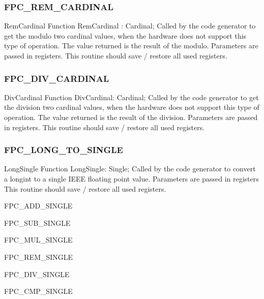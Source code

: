 \documentclass [a4paper,12pt]{article}
\begin{document}
\subsubsection{FPC{\_}REM{\_}CARDINAL}
\label{subsubsec:mylabel107}

\begin{function}{RemCardinal}
\Declaration
Function RemCardinal : Cardinal;
\Description
Called by the code generator to get the modulo two cardinal values, when the
hardware does not support this type of operation. The value returned is the
result of the modulo.
\Parameters
Parameters are passed in registers.
\Notes
This routine should save / restore all used registers.
\end{function}

\subsubsection{FPC{\_}DIV{\_}CARDINAL}
\label{subsubsec:mylabel108}

\begin{function}{DivCardinal}
\Declaration
Function DivCardinal: Cardinal;
\Description
Called by the code generator to get the division two cardinal values, when
the hardware does not support this type of operation. The value returned is
the result of the division.
\Parameters
Parameters are passed in registers.
\Notes
This routine should save / restore all used registers.
\end{function}

\subsubsection{FPC{\_}LONG{\_}TO{\_}SINGLE}
\label{subsubsec:mylabel109}

\begin{function}{LongSingle}
\Declaration
Function LongSingle: Single;
\Description
Called by the code generator to convert a longint to a single IEEE floating
point value.
\Parameters
Parameters are passed in registers
\Notes
This routine should save / restore all used registers.
\end{function}

FPC{\_}ADD{\_}SINGLE

FPC{\_}SUB{\_}SINGLE

FPC{\_}MUL{\_}SINGLE

FPC{\_}REM{\_}SINGLE

FPC{\_}DIV{\_}SINGLE

FPC{\_}CMP{\_}SINGLE
\end{document}
